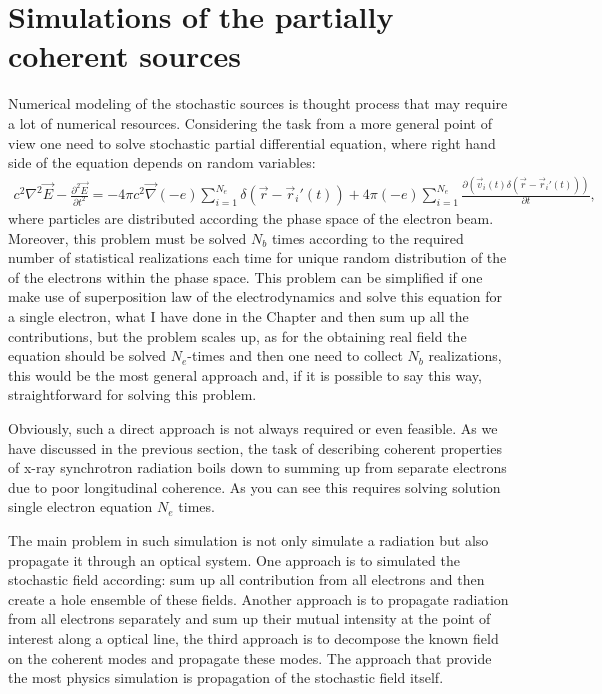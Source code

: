 \section{Simulations of the partially coherent sources}   
    Numerical modeling of the stochastic sources is thought process that may require a lot of numerical resources. Considering the task from a more general point of view one need to solve stochastic partial differential equation,    where right hand side of the equation depends on random variables:
    \begin{align}
        c^2 \nabla^2 \vec{E} - \frac{\partial^2 \vec{E}}{\partial t^2} = - 4 \pi c^2 \vec{\nabla} (-e) \sum_{i=1}^{N_e}\delta(\vec{r} - \vec{r}_i'(t)) + 4 \pi (-e) \sum_{i=1}^{N_e}\frac{\partial (\vec{v}_i(t)\delta(\vec{r} - \vec{r}_i'(t)))}{\partial t},
    \end{align}
    where particles are distributed according the phase space of the electron beam. Moreover, this problem must be solved $N_b$ times according to the required number of statistical realizations each time for unique random distribution of the of the electrons within the phase space.
    This problem can be simplified if one make use of superposition law of the electrodynamics and solve this equation for a single electron, what I have done in the Chapter  and then sum up all the contributions, but the problem scales up, as for the obtaining real field the equation should be solved $N_e$-times and then one need to collect $N_b$ realizations, this would be the most general approach and, if it is possible to say this way, straightforward for solving this problem.

    
    Obviously, such a direct approach is not always required or even feasible. As we have discussed in the previous section, the task of describing coherent properties of x-ray synchrotron radiation boils down to summing up  from separate electrons due to poor longitudinal coherence. As you can see this requires solving solution single electron equation $N_e$ times.

    The main problem in such simulation is not only simulate a radiation but also propagate it through an optical system. One approach is to simulated the stochastic field according: sum up all contribution from all electrons and then create a hole ensemble of these fields. Another approach is to propagate radiation from all electrons separately and sum up their mutual intensity at the point of interest along a optical line, the third approach is to decompose the known field on the coherent modes and propagate these modes. The approach that provide the most physics simulation is propagation of the stochastic field itself. 

